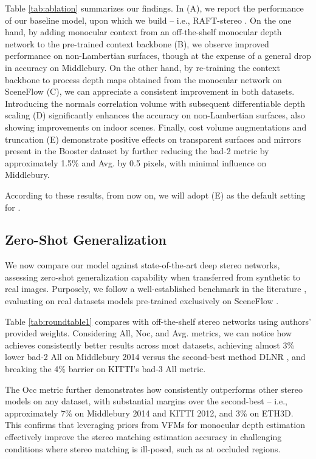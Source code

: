 Table \ref{tab:ablation} summarizes our findings. In (A), we report the performance of our baseline model, upon which we build \method -- i.e., RAFT-stereo \cite{lipson2021raft}. On the one hand, by adding monocular context from an off-the-shelf monocular depth network to the pre-trained context backbone (B), we observe improved performance on non-Lambertian surfaces, though at the expense of a general drop in accuracy on Middlebury. On the other hand, by re-training the context backbone to process depth maps obtained from the monocular network on SceneFlow (C), we can appreciate a consistent improvement in both datasets. 
Introducing the normals correlation volume with subsequent differentiable depth scaling (D) significantly enhances the accuracy on non-Lambertian surfaces, also showing improvements on indoor scenes.
Finally, cost volume augmentations and truncation (E) demonstrate positive effects on transparent surfaces and mirrors present in the Booster dataset by further reducing the bad-2 metric by approximately 1.5\% and Avg. by 0.5 pixels, with minimal influence on Middlebury.

According to these results, from now on, we will adopt (E) as the default setting for \method.

\subsection{Zero-Shot Generalization}

We now compare our \method model against state-of-the-art deep stereo networks, assessing zero-shot generalization capability when transferred from synthetic to real images.
Purposely, we follow a well-established benchmark in the literature \cite{lipson2021raft,Tosi_2023_CVPR}, evaluating on real datasets models pre-trained exclusively on SceneFlow \cite{mayer2016large}.

Table \ref{tab:roundtable1} compares \method with off-the-shelf stereo networks using authors' provided weights. Considering All, Noc, and Avg. metrics, we can notice how \method achieves consistently better results across most datasets, achieving almost 3\% lower bad-2 All on Middlebury 2014 versus the second-best method DLNR \cite{zhao2023high}, and breaking the 4\% barrier on KITTI's bad-3 All metric. 

The Occ metric further demonstrates how \method{} consistently outperforms other stereo models on any dataset, with substantial margins over the second-best -- i.e., approximately 7\% on Middlebury 2014 and KITTI 2012, and 3\% on ETH3D. This confirms that leveraging priors from VFMs for monocular depth estimation effectively improve the stereo matching estimation accuracy in challenging conditions where stereo matching is ill-posed, such as at occluded regions.

